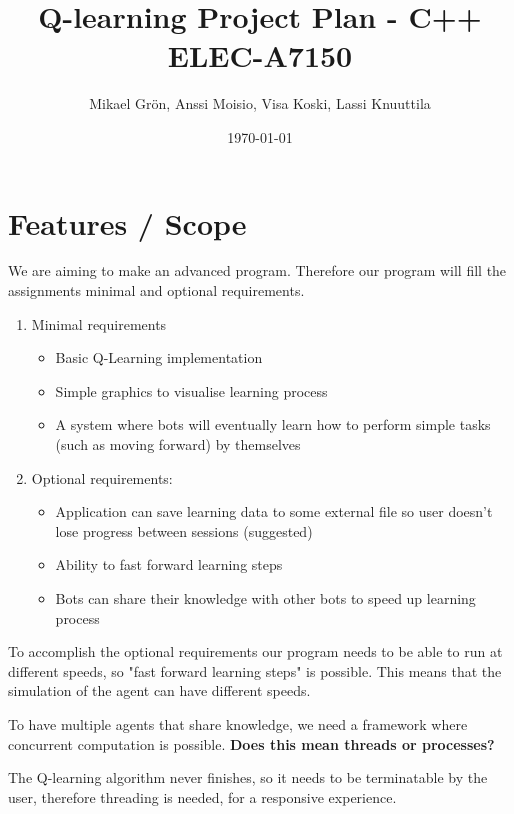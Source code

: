 \documentclass{article}
\author{Mikael Grön, Anssi Moisio, Visa Koski, Lassi Knuuttila}
\title{Q-learning Project Plan - C++ ELEC-A7150}
\date{\today}
\begin{document}
\maketitle



\section{Features / Scope}
We are aiming to make an advanced program. Therefore our program will fill
the assignments minimal and optional requirements.

\begin{enumerate}
\item Minimal requirements
    \begin{itemize}
    \item Basic Q-Learning implementation
    \item Simple graphics to visualise learning process
    \item A system where bots will eventually learn how to perform simple
    tasks (such as moving forward) by themselves
    \end{itemize}
\item Optional requirements:
    \begin{itemize}
    \item Application can save learning data to some external file so user
    doesn't lose progress between sessions (suggested)
    \item Ability to fast forward learning steps
    \item Bots can share their knowledge with other bots to speed up learning
    process
    \end{itemize}
\end{enumerate}

To accomplish the optional requirements our program needs to be able to run
at different speeds, so "fast forward learning steps" is possible. This
means that the simulation of the agent can have different speeds.

To have multiple agents that share knowledge, we need a framework where
concurrent computation is possible. \textbf{Does this mean threads or
processes?}

The Q-learning algorithm never finishes, so it needs to be terminatable
by the user, therefore threading is needed, for a responsive experience.
\end{document}
